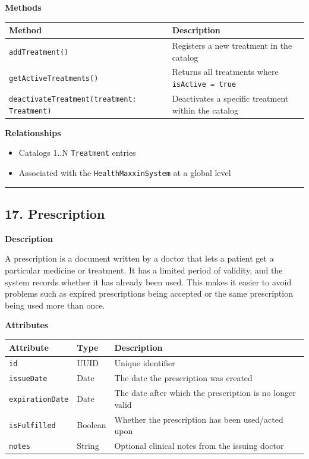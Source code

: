 \documentclass[12pt, a4paper]{article}
\begin{document}
\textbf{Methods}

\begin{center}
\small
\renewcommand{\arraystretch}{1.35}
\begin{tabularx}{\textwidth}{|M|Y|}
\hline
{}
\textbf{Method} & \textbf{Description} \\ \hline
\texttt{addTreatment()} & Registers a new treatment in the catalog \\ \hline
\texttt{getActiveTreatments()} & Returns all treatments where \texttt{isActive = true} \\ \hline
\texttt{deactivateTreatment(treatment: Treatment)} & Deactivates a specific treatment within the catalog \\ \hline
\end{tabularx}
\end{center}

\textbf{Relationships}

\begin{itemize}
    \item Catalogs 1..N \texttt{Treatment} entries
    \item Associated with the \texttt{HealthMaxxinSystem} at a global level
\end{itemize}

\par\medskip\hrule\medskip

\subsection{17. Prescription}\label{sec:17-prescription}

\textbf{Description}

A prescription is a document written by a doctor that lets a patient get a particular medicine or treatment. It has a limited period of validity, and the system records whether it has already been used. This makes it easier to avoid problems such as expired prescriptions being accepted or the same prescription being used more than once.

\textbf{Attributes}

\begin{center}
\small
\renewcommand{\arraystretch}{1.35}
\begin{tabularx}{\textwidth}{|>{\raggedright\arraybackslash}p{3.4cm}|>{\raggedright\arraybackslash}p{3.3cm}|Y|}
\hline
{}
\textbf{Attribute} & \textbf{Type} & \textbf{Description} \\ \hline
\texttt{id} & UUID & Unique identifier \\ \hline
\texttt{issueDate} & Date & The date the prescription was created \\ \hline
\texttt{expirationDate} & Date & The date after which the prescription is no longer valid \\ \hline
\texttt{isFulfilled} & Boolean & Whether the prescription has been used/acted upon \\ \hline
\texttt{notes} & String & Optional clinical notes from the issuing doctor \\ \hline
\end{tabularx}
\end{center}
\end{document}
